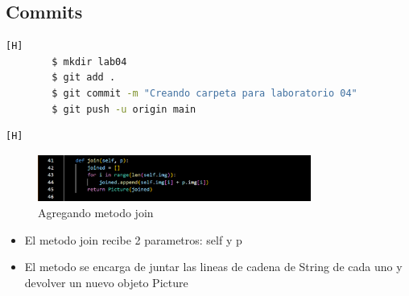 \documentclass{article}
\begin{document}
	\subsection{Commits}
	\begin{lstlisting}[language=bash,caption={Primer Commit Creando carpeta para laboratorio 04}][H]
		$ mkdir lab04
		$ git add .
		$ git commit -m "Creando carpeta para laboratorio 04"			
		$ git push -u origin main
	\end{lstlisting}
	
	\begin{lstlisting}[language=bash,caption={Agregando metodo join de la clase Picture}][H]
	\end{lstlisting}
	\begin{figure}[H]
		\centering
		\includegraphics[width=0.8\textwidth,keepaspectratio]{img/join.png}
		\caption{Agregando metodo join}
	\end{figure}
	\begin{itemize}	
		\item El metodo join recibe 2 parametros: self y p
		\item El metodo se encarga de juntar las lineas de cadena de String de cada uno y devolver un nuevo objeto Picture
	\end{itemize}
\end{document}
